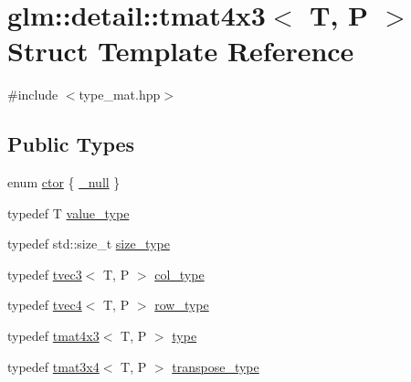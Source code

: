 \hypertarget{structglm_1_1detail_1_1tmat4x3}{}\section{glm\+:\+:detail\+:\+:tmat4x3$<$ T, P $>$ Struct Template Reference}
\label{structglm_1_1detail_1_1tmat4x3}


{\ttfamily \#include $<$type\+\_\+mat.\+hpp$>$}

\subsection*{Public Types}
\begin{DoxyCompactItemize}
\item 
enum \hyperlink{structglm_1_1detail_1_1tmat4x3_ac17f13b8e4946fda04e2c86b280491fe}{ctor} \{ \hyperlink{structglm_1_1detail_1_1tmat4x3_ac17f13b8e4946fda04e2c86b280491fea33e3c4104a445d43d8c7800a5ead890a}{\+\_\+null}
 \}
\item 
typedef T \hyperlink{structglm_1_1detail_1_1tmat4x3_a059eb027e7aebee491c0edcf17235557}{value\+\_\+type}
\item 
typedef std\+::size\+\_\+t \hyperlink{structglm_1_1detail_1_1tmat4x3_aceab433265627d5787fe291463d19b91}{size\+\_\+type}
\item 
typedef \hyperlink{structglm_1_1detail_1_1tvec3}{tvec3}$<$ T, P $>$ \hyperlink{structglm_1_1detail_1_1tmat4x3_a58afd510f7ab968e5a86e20f2f3979de}{col\+\_\+type}
\item 
typedef \hyperlink{structglm_1_1detail_1_1tvec4}{tvec4}$<$ T, P $>$ \hyperlink{structglm_1_1detail_1_1tmat4x3_a4c401c9b82fb80f9646813f0d9c1c70e}{row\+\_\+type}
\item 
typedef \hyperlink{structglm_1_1detail_1_1tmat4x3}{tmat4x3}$<$ T, P $>$ \hyperlink{structglm_1_1detail_1_1tmat4x3_aee33430c6a618f2452a740cd4a509a03}{type}
\item 
typedef \hyperlink{structglm_1_1detail_1_1tmat3x4}{tmat3x4}$<$ T, P $>$ \hyperlink{structglm_1_1detail_1_1tmat4x3_a80f4669c67e4c9fb3e9f44d3dcf439d2}{transpose\+\_\+type}
\end{DoxyCompactItemize}
